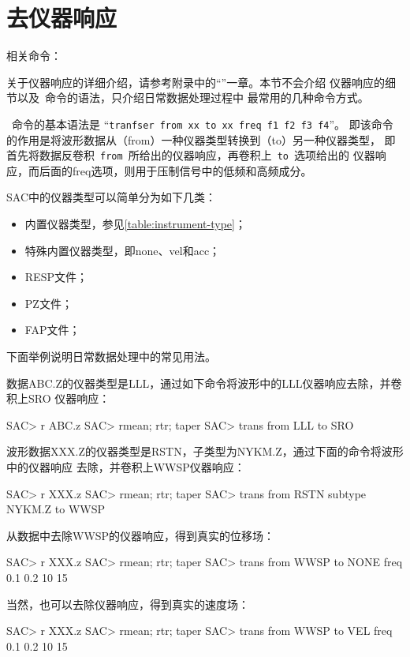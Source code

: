 \section{去仪器响应}
\label{sec:instrument-response}
相关命令：

关于仪器响应的详细介绍，请参考附录中的``''一章。本节不会介绍
仪器响应的细节以及~命令的语法，只介绍日常数据处理过程中
最常用的几种命令方式。

~命令的基本语法是
``\verb+tranfser from xx to xx freq f1 f2 f3 f4+''。
即该命令的作用是将波形数据从（from）一种仪器类型转换到（to）另一种仪器类型，
即首先将数据反卷积~\verb+from+~所给出的仪器响应，再卷积上~\verb+to+~选项给出的
仪器响应，而后面的freq选项，则用于压制信号中的低频和高频成分。

SAC中的仪器类型可以简单分为如下几类：
\begin{itemize}
\item 内置仪器类型，参见\ref{table:instrument-type}；
\item 特殊内置仪器类型，即none、vel和acc；
\item RESP文件；
\item PZ文件；
\item FAP文件；
\end{itemize}

下面举例说明日常数据处理中的常见用法。

数据ABC.Z的仪器类型是LLL，通过如下命令将波形中的LLL仪器响应去除，并卷积上SRO
仪器响应：
\begin{SACCode}
SAC> r ABC.z
SAC> rmean; rtr; taper
SAC> trans from LLL to SRO
\end{SACCode}

波形数据XXX.Z的仪器类型是RSTN，子类型为NYKM.Z，通过下面的命令将波形中的仪器响应
去除，并卷积上WWSP仪器响应：
\begin{SACCode}
SAC> r XXX.z
SAC> rmean; rtr; taper
SAC> trans from RSTN subtype NYKM.Z to WWSP
\end{SACCode}

从数据中去除WWSP的仪器响应，得到真实的位移场：
\begin{SACCode}
SAC> r XXX.z
SAC> rmean; rtr; taper
SAC> trans from WWSP to NONE freq 0.1 0.2 10 15
\end{SACCode}

当然，也可以去除仪器响应，得到真实的速度场：
\begin{SACCode}
SAC> r XXX.z
SAC> rmean; rtr; taper
SAC> trans from WWSP to VEL freq 0.1 0.2 10 15
\end{SACCode}

